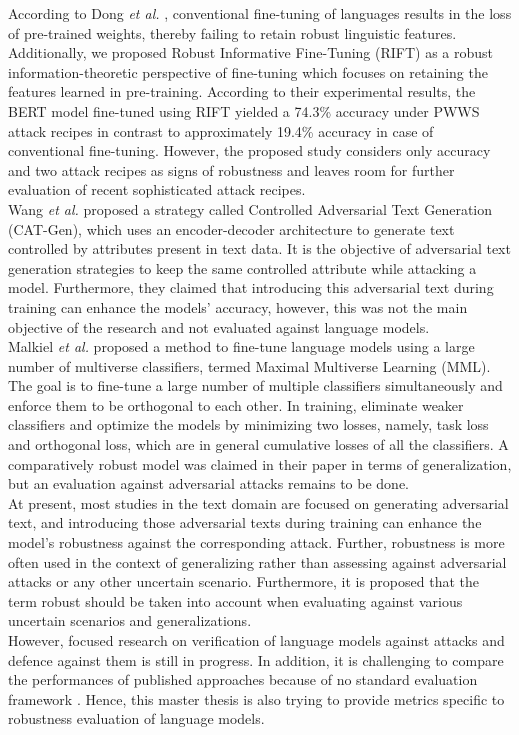 \documentclass[%
	BCOR=8mm, %
	DIV=12,
	toc=bibliography, %
	toc=listof, %
	oneside, %
	egregdoesnotlikesansseriftitles, %
	]{scrbook}
\begin{document}
According to Dong \textit{et al.} \cite{dong_how_2021}, conventional fine-tuning of languages results in the loss of pre-trained weights, thereby failing to retain robust linguistic features. Additionally, we proposed Robust Informative Fine-Tuning (RIFT) as a robust information-theoretic perspective of fine-tuning which focuses on retaining the features learned in pre-training. According to their experimental results, the BERT model fine-tuned using RIFT yielded a 74.3\% accuracy under PWWS attack recipes in contrast to  approximately 19.4\% accuracy in case of conventional fine-tuning. However, the proposed study considers only accuracy and two attack recipes as signs of robustness and leaves room for further evaluation of recent sophisticated attack recipes.\\
Wang \textit{et al.} \cite{wang_cat-gen_2020} proposed a strategy called Controlled Adversarial Text Generation (CAT-Gen), which uses an encoder-decoder architecture to generate text controlled by attributes present in text data. It is the objective of adversarial text generation strategies to keep the same controlled attribute while attacking a model. Furthermore, they claimed that introducing this adversarial text during training can enhance the models' accuracy, however, this was not the main objective of the research and not evaluated against language models.\\
 Malkiel \textit{et al.} \cite{malkiel_mml_2019} proposed a method to fine-tune language models using a large number of multiverse classifiers, termed Maximal Multiverse Learning (MML). The goal is to fine-tune a large number of multiple classifiers simultaneously and enforce them to be orthogonal to each other. In training, eliminate weaker classifiers and optimize the models by minimizing two losses, namely, task loss and orthogonal loss, which are in general cumulative losses of all the classifiers. A comparatively robust model was claimed in their paper in terms of generalization, but an evaluation against adversarial attacks remains to be done.\\
At present, most studies in the text domain are focused on generating adversarial text, and introducing those adversarial texts during training can enhance the model's robustness against the corresponding attack.  Further, robustness is more often used in the context of generalizing rather than assessing against adversarial attacks or any other uncertain scenario. Furthermore, it is proposed that the term robust should be taken into account when evaluating against various uncertain scenarios and generalizations. \\
However, focused research on verification of language models against attacks and defence against them is still in progress. In addition, it is challenging to compare the performances of published approaches because of no standard evaluation framework \cite{moradi_evaluating_2021-1}. Hence, this master thesis is also trying to provide metrics specific to robustness evaluation of language models.
\end{document}
